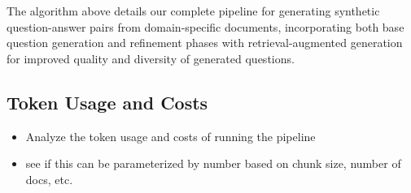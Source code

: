 The algorithm above details our complete pipeline for generating synthetic question-answer pairs 
from domain-specific documents, incorporating both base question generation and refinement phases
with retrieval-augmented generation for improved quality and diversity of generated questions.


\subsection{Token Usage and Costs}


\begin{itemize}
  \item Analyze the token usage and costs of running the pipeline
  \item see if this can be parameterized by number based on chunk size, number of docs, etc.
\end{itemize}
